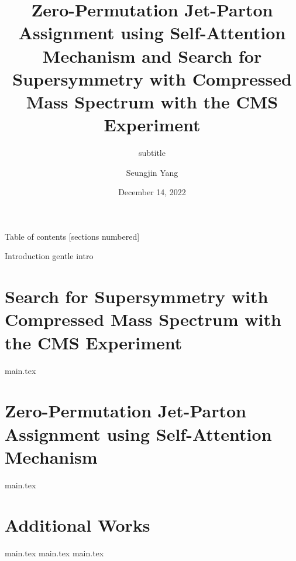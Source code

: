 \documentclass[10pt]{beamer}
\title{Zero-Permutation Jet-Parton Assignment using Self-Attention Mechanism and Search for Supersymmetry with Compressed Mass Spectrum with the CMS Experiment}
\subtitle{subtitle}
\author{Seungjin Yang}
\institute[VFU]{University of Seoul}
\date{December 14, 2022}
\begin{document}
\begin{frame}
    \maketitle
\end{frame}

\begin{frame}{Table of contents}
  [sections numbered]
  \tableofcontents%
\end{frame}

\begin{frame}[fragile]{Introduction}
  gentle intro
\end{frame}

\section{Search for Supersymmetry with Compressed Mass Spectrum with the CMS Experiment}
{main.tex}

\section{Zero-Permutation Jet-Parton Assignment using Self-Attention Mechanism}
{main.tex}

\section{Additional Works}
{main.tex}
{main.tex}
{main.tex}
\end{document}
